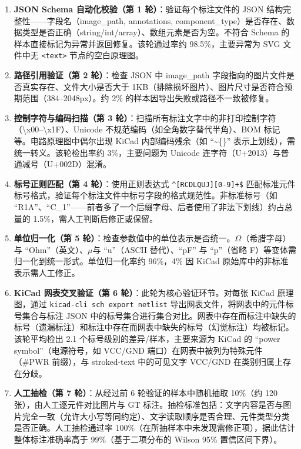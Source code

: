 \begin{enumerate}[nosep]
    \item \textbf{JSON Schema 自动化校验（第 1 轮）}：验证每个标注文件的 JSON 结构完整性——字段名（image\_path, annotations, component\_type）是否存在、数据类型是否正确（string/int/array）、数组元素是否为空。不符合 Schema 的样本直接标记为异常并返回修复。该轮通过率约 98.5\%，主要异常为 SVG 文件中无 \texttt{<text>} 节点的空白原理图。
    \item \textbf{路径引用验证（第 2 轮）}：检查 JSON 中 image\_path 字段指向的图片文件是否真实存在、文件大小是否大于 1KB（排除损坏图片）、图片尺寸是否符合预期范围（384--2048px）。约 2\% 的样本因导出失败或路径不一致被修复。
    \item \textbf{控制字符与编码扫描（第 3 轮）}：扫描所有标注文字中的非打印控制字符（\textbackslash x00--\textbackslash x1F）、Unicode 不规范编码（如全角数字替代半角）、BOM 标记等。电路原理图中偶尔出现 KiCad 内部编码残余（如 ``\textasciitilde\{\}'' 表示上划线），需统一转义。该轮检出率约 3\%，主要问题为 Unicode 连字符（U+2013）与普通减号（U+002D）混淆。
    \item \textbf{标号正则匹配（第 4 轮）}：使用正则表达式 \texttt{\^{}[RCDLQUJ][0-9]+\$} 匹配标准元件标号格式，验证每个标注文件中标号字段的格式规范性。非标准标号（如 ``R1A''、``C\_1''——前者多了一个后缀字母、后者使用了非法下划线）约占总量的 1.5\%，需人工判断后修正或保留。
    \item \textbf{单位归一化（第 5 轮）}：检查参数值中的单位表示是否统一。$\Omega$（希腊字母）与 ``Ohm''（英文）、$\mu$与 ``u''（ASCII 替代）、``pF'' 与 ``p''（省略 F）等变体需归一化到统一形式。单位归一化率约 96\%，4\% 因 KiCad 原始库中的非标准表示需人工修正。
    \item \textbf{KiCad 网表交叉验证（第 6 轮）}：此轮为核心验证环节。对每张 KiCad 原理图，通过 \texttt{kicad-cli sch export netlist} 导出网表文件，将网表中的元件标号集合与标注 JSON 中的标号集合进行集合对比。网表中存在而标注中缺失的标号（遗漏标注）和标注中存在而网表中缺失的标号（幻觉标注）均被标记。该轮平均检出 2.1 个标号级别的差异/样本，主要来源为 KiCad 的 ``power symbol''（电源符号，如 VCC/GND 端口）在网表中被列为特殊元件（\#PWR 前缀），与 stroked-text 中的可见文字 VCC/GND 在类别归属上存在分歧。
    \item \textbf{人工抽检（第 7 轮）}：从经过前 6 轮验证的样本中随机抽取 10\%（约 120 张），由人工逐元件对比图片与 GT 标注。抽检标准包括：文字内容是否与图片完全一致（允许大小写等同约定）、文字读取顺序是否合理、元件类型分类是否正确。人工抽检通过率 100\%（在所抽样本中未发现需修正项），据此估计整体标注准确率高于 99\%（基于二项分布的 Wilson 95\% 置信区间下界）。
\end{enumerate}

